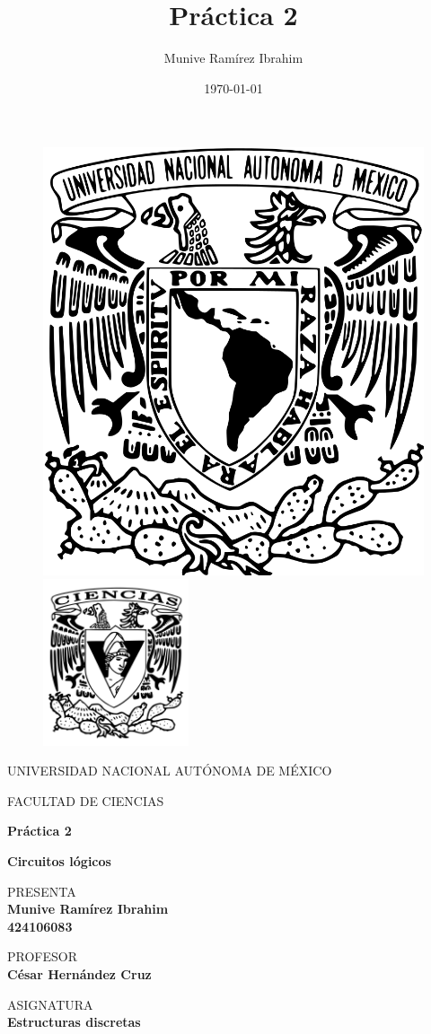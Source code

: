
\title{Práctica 2}
\author{Munive Ramírez Ibrahim}
\date{\today}

\thispagestyle{empty}
\begin{figure}[ht]
	\includegraphics[width = 4 cm]{logo_unam.png}
	\endminipage
	\includegraphics[height = 4.9cm, width = 4 cm]{logo_ciencias.png}
	\endminipage
\end{figure}

\begin{center}
	\vspace{0.5cm}
	\LARGE
	UNIVERSIDAD NACIONAL AUTÓNOMA DE MÉXICO

	\vspace{0.5cm}
	\LARGE
	FACULTAD DE CIENCIAS

	\vspace{1.5cm}
	\Large
	\textbf{Práctica 2}
	
	\textbf{Circuitos lógicos}

	\vspace{1cm}
	\normalsize
	PRESENTA \\
	\vspace{.3cm}
	\large
	\textbf{Munive Ramírez Ibrahim  \\ 424106083}

	\vspace{1cm}
	\normalsize
	PROFESOR \\
	\vspace{.3cm}
	\large
	\textbf{César Hernández Cruz}

	\vspace{1cm}
	\normalsize
	ASIGNATURA \\
	\vspace{.3cm}
	\large
	\textbf{Estructuras discretas}

	\vspace{1cm}
\end{center}

\newpage
